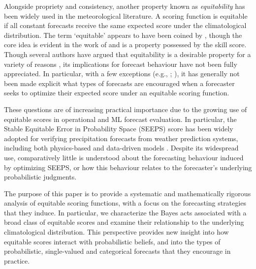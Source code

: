 \documentclass[10pt]{article} %
\theoremstyle{theorem}
\theoremstyle{definition}
\begin{document}
Alongside propriety and consistency, another property known as \textit{equitability} has been widely used in the meteorological literature. A scoring function is equitable if all constant forecasts receive the same expected score under the climatological distribution. The term `equitable' appears to have been coined by \citet{gandin1992equitable}, though the core idea is evident in the work of \citet{gringorten1951verification, gringorten1965measure, gringorten1967verification} and is a property possessed by the \citet{peirce1884numerical} skill score. Though several authors have argued that equitability is a desirable property for a variety of reasons \citep{gandin1992equitable, potts1996revised, Livezey2003Categorical, jolliffe2008impenetrable, hogan2010equitability, rodwell2010new}, its implications for forecast behaviour have not been fully appreciated. In particular, with a few exceptions (e.g., \citealt[Fig.~3]{gandin1992equitable}; \citealt{ben2021verification}), it has generally not been made explicit what types of forecasts are encouraged when a forecaster seeks to optimize their expected score under an equitable scoring function.

These questions are of increasing practical importance due to the growing use of equitable scores in operational and ML forecast evaluation. In particular, the Stable Equitable Error in Probability Space (SEEPS) score \citep{rodwell2010new} has been widely adopted for verifying precipitation forecasts from weather prediction systems, including both physics-based and data-driven models \citep{north2013assessment, lavers2022evaluation, lang2024aifs, rasp2024weatherbench, radford2025comparison, pan2025comparative, sha2025investigating, moldovan2025update}. Despite its widespread use, comparatively little is understood about the forecasting behaviour induced by optimizing SEEPS, or how this behaviour relates to the forecaster's underlying probabilistic judgments.

The purpose of this paper is to provide a systematic and mathematically rigorous analysis of equitable scoring functions, with a focus on the forecasting strategies that they induce. In particular, we characterize the Bayes acts associated with a broad class of equitable scores and examine their relationship to the underlying climatological distribution. This perspective provides new insight into how equitable scores interact with probabilistic beliefs, and into the types of probabilistic, single-valued and categorical forecasts that they encourage in practice.
\end{document}
